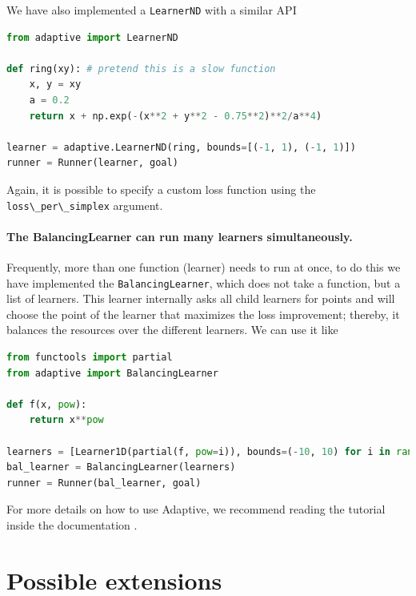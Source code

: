 We have also implemented a \passthrough{\lstinline!LearnerND!} with a similar API

\begin{lstlisting}[language=Python]
from adaptive import LearnerND

def ring(xy): # pretend this is a slow function
    x, y = xy
    a = 0.2
    return x + np.exp(-(x**2 + y**2 - 0.75**2)**2/a**4)

learner = adaptive.LearnerND(ring, bounds=[(-1, 1), (-1, 1)])
runner = Runner(learner, goal)
\end{lstlisting}

Again, it is possible to specify a custom loss function using the \passthrough{\lstinline!loss\_per\_simplex!} argument.

\hypertarget{the-balancinglearner-can-run-many-learners-simultaneously.}{%
\paragraph{The BalancingLearner can run many learners simultaneously.}\label{the-balancinglearner-can-run-many-learners-simultaneously.}}

Frequently, more than one function (learner) needs to run at once, to do this we have implemented the \passthrough{\lstinline!BalancingLearner!}, which does not take a function, but a list of learners.
This learner internally asks all child learners for points and will choose the point of the learner that maximizes the loss improvement; thereby, it balances the resources over the different learners.
We can use it like

\begin{lstlisting}[language=Python]
from functools import partial
from adaptive import BalancingLearner

def f(x, pow):
    return x**pow

learners = [Learner1D(partial(f, pow=i)), bounds=(-10, 10) for i in range(2, 10)]
bal_learner = BalancingLearner(learners)
runner = Runner(bal_learner, goal)
\end{lstlisting}

For more details on how to use Adaptive, we recommend reading the tutorial inside the documentation \cite{Nijholt2018}.

\hypertarget{possible-extensions}{%
\section{Possible extensions}\label{possible-extensions}}

